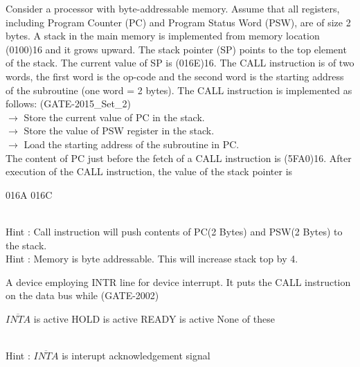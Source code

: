 \begin{questyle}
  \question  Consider a processor with byte-addressable memory. Assume that all registers,
             including Program Counter (PC) and Program Status Word (PSW), are of size 2 bytes. A
             stack in the main memory is implemented from memory location (0100)16 and it grows
             upward. The stack pointer (SP) points to the top element of the stack. The current
             value of SP is (016E)16. The CALL instruction is of two words, the first word is
             the op-code and the second word is the starting address of the subroutine
             (one word = 2 bytes). The CALL instruction is implemented as follows: (GATE-2015\_Set\_2)
             \\ \(\rightarrow\) Store the current value of PC in the stack.
             \\ \(\rightarrow\) Store the value of PSW register in the stack.
             \\ \(\rightarrow\) Load the starting address of the subroutine in PC. \\
             The content of PC just before the fetch of a CALL instruction is (5FA0)16. After
             execution of the CALL instruction, the value of the stack pointer is

  \begin{oneparchoices}
    \choice         016A
    \choice         016C
  \end{oneparchoices}
  \\ Hint : Call instruction will push contents of PC(2 Bytes) and PSW(2 Bytes) to the stack.
  \\ Hint : Memory is byte addressable. This will increase stack top by 4.

\end{questyle}

\begin{questyle}
  \question  A device employing INTR line for device interrupt. It puts the CALL instruction
             on the data bus while  (GATE-2002)

  \begin{oneparchoices}
    \CorrectChoice  \( \overline{INTA} \) is active
    \choice         HOLD is active
    \choice         READY is active
    \choice         None of these
  \end{oneparchoices}
  \\ Hint : \( \overline{INTA} \)  is interupt acknowledgement signal
\end{questyle}



